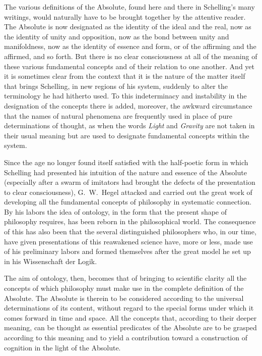 \documentclass[12pt]{article}
\newcommand{\opage}[1]{\marginnote{\footnotesize\textit{[#1]}}}
\begin{document}
The various definitions of the Absolute, found here and there in Schelling's many
writings, would naturally have to be brought together by the attentive reader. The
Absolute is now designated as the identity of the ideal and the real, now as the
identity of unity and opposition, now as the bond between unity and manifoldness,
now as the identity of essence and form, or of the affirming and the affirmed, and
so forth. But there is no clear consciousness at all of the meaning of these
various fundamental concepts and of their relation to one another. And yet it is
sometimes clear from the context that it is the nature of the matter itself that
brings Schelling, in new regions of his system, suddenly to alter the terminology
he had hitherto used. To this indeterminacy and instability in the designation of
the concepts there is added, moreover, the awkward circumstance that the names of
natural phenomena are frequently used in place of pure determinations of thought,
as when the words \emph{Light} and \emph{Gravity} are not taken in their usual
meaning but are used to designate fundamental concepts within the system.

Since the age no longer found itself satisfied with the half-poetic form in which
Schelling had presented his intuition of the nature and essence of the Absolute
(especially after a swarm of imitators had brought the defects of the presentation
to clear consciousness), G.\ W.\ Hegel attacked and carried out the great work of
developing all the fundamental concepts of philosophy in systematic connection. By
his labors the idea of ontology, in the form that the present shape of philosophy
requires, has been reborn in the philosophical \opage{195}world. The consequence
of this has also been that the several distinguished philosophers who, in our
time, have given presentations of this reawakened science have, more or less, made
use of his preliminary labors and formed themselves after the great model he set
up in his Wissenschaft der Logik.

The aim of ontology, then, becomes that of bringing to scientific clarity all the
concepts of which philosophy must make use in the complete definition of the
Absolute. The Absolute is therein to be considered according to the universal
determinations of its content, without regard to the special forms under which it
comes forward in time and space. All the concepts that, according to their deeper
meaning, can be thought as essential predicates of the Absolute are to be grasped
according to this meaning and to yield a contribution toward a construction of
cognition in the light of the Absolute.
\end{document}
